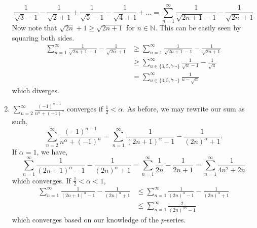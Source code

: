 \documentclass{article}
\begin{document}
\begin{enumerate}[label=(\alph*)]
\begin{equation*}
        \frac{1}{\sqrt{3}-1} - \frac{1}{\sqrt{2}+1} + \frac{1}{\sqrt{5}-1} - \frac{1}{\sqrt{4}+1} + ... = \sum_{n=1}^{\infty} \frac{1}{\sqrt{2n+1}-1} - \frac{1}{\sqrt{2n}+1}
    \end{equation*}
    Now note that $\sqrt{2n}+1 \geq \sqrt{2n+1}$ for $n \in \mathbb{N}$. This can be easily seen by squaring both sides.
    \begin{align*}
        \sum_{n=1}^{\infty} \frac{1}{\sqrt{2n+1}-1} - \frac{1}{\sqrt{2n}+1} &\geq         \sum_{n=1}^{\infty} \frac{1}{\sqrt{2n+1}-1} - \frac{1}{\sqrt{2n+1}} \\
        &\geq \sum_{u \in \{3, 5, 7 \cdots \}}^{\infty} \frac{1}{\sqrt{u}-1} - \frac{1}{\sqrt{u}} \\
        &= \sum_{u \in \{3, 5, 7 \cdots \}}^{\infty} \frac{1}{u - \sqrt{u}}
    \end{align*}
    which diverges.
    \item $\sum_{n=2}^{\infty} \frac{(-1)^{n-1}}{n^{\alpha} + (-1)^n}$ converges if $\frac{1}{2}<\alpha$.
    As before, we may rewrite our sum as such,
    \begin{equation*}
        \sum_{n=2}^{\infty} \frac{(-1)^{n-1}}{n^{\alpha} + (-1)^n} = \sum_{n=1}^{\infty} \frac{1}{(2n+1)^{\alpha} - 1} - \frac{1}{(2n)^{\alpha}+1}.
    \end{equation*}
    If $\alpha=1$, we have,
    \begin{equation*}
        \sum_{n=1}^{\infty} \frac{1}{(2n+1)^{\alpha} - 1} - \frac{1}{(2n)^{\alpha}+1} = \sum_{n=1}^{\infty} \frac{1}{2n} - \frac{1}{2n+1} =\sum_{n=1}^{\infty} \frac{1}{4n^2+2n}
    \end{equation*}
    which converges. If $\frac{1}{2} < \alpha <1$,
    \begin{align*}
        \sum_{n=1}^{\infty} \frac{1}{(2n+1)^{\alpha} - 1} - \frac{1}{(2n)^{\alpha}+1} &\leq     \sum_{n=1}^{\infty} \frac{1}{(2n)^{\alpha} - 1} - \frac{1}{(2n)^{\alpha}+1} \\
        &\leq \sum_{n=1}^{\infty} \frac{2}{(2n)^{2\alpha}-1} 
    \end{align*}
    which converges based on our knowledge of the $p$-series.
\end{enumerate}
\end{document}
